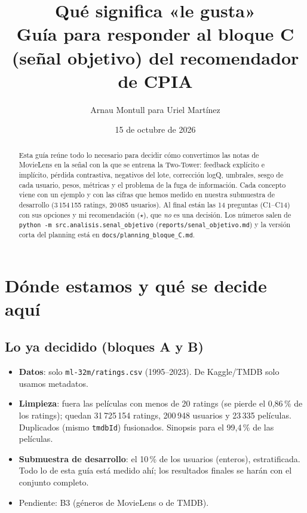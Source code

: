 \documentclass[a4paper,11pt]{article}
\title{\textbf{Qué significa «le gusta»}\\[4pt]
\large Guía para responder al bloque C (señal objetivo) del recomendador de CPIA}
\author{Arnau Montull \quad para \quad Uriel Martínez}
\date{15 de octubre de 2026}
\newcommand{\rec}{\ensuremath{\star}}
\begin{document}
\maketitle

\begin{abstract}
\noindent Esta guía reúne todo lo necesario para decidir cómo convertimos las notas de MovieLens en la señal con la
que se entrena la Two-Tower: feedback explícito e implícito, pérdida contrastiva, negativos del lote, corrección logQ,
umbrales, sesgo de cada usuario, pesos, métricas y el problema de la fuga de información. Cada concepto viene con un
ejemplo y con las cifras que hemos medido en nuestra submuestra de desarrollo (3\,154\,155 ratings, 20\,085 usuarios).
Al final están las 14 preguntas (C1--C14) con sus opciones y mi recomendación (\rec), que \emph{no} es una decisión.
Los números salen de \texttt{python -m src.analisis.senal\_objetivo} (\texttt{reports/senal\_objetivo.md}) y la versión
corta del planning está en \texttt{docs/planning\_bloque\_C.md}.
\end{abstract}

\tableofcontents
\newpage

\section{Dónde estamos y qué se decide aquí}

\subsection{Lo ya decidido (bloques A y B)}
\begin{itemize}
  \item \textbf{Datos}: solo \texttt{ml-32m/ratings.csv} (1995--2023). De Kaggle/TMDB solo usamos metadatos.
  \item \textbf{Limpieza}: fuera las películas con menos de 20 ratings (se pierde el 0,86\,\% de los ratings); quedan
        31\,725\,154 ratings, 200\,948 usuarios y 23\,335 películas. Duplicados (mismo \texttt{tmdbId}) fusionados.
        Sinopsis para el 99,4\,\% de las películas.
  \item \textbf{Submuestra de desarrollo}: el 10\,\% de los usuarios (enteros), estratificada. Todo lo de esta guía
        está medido ahí; los resultados finales se harán con el conjunto completo.
  \item Pendiente: B3 (géneros de MovieLens o de TMDB).
\end{itemize}
\end{document}

